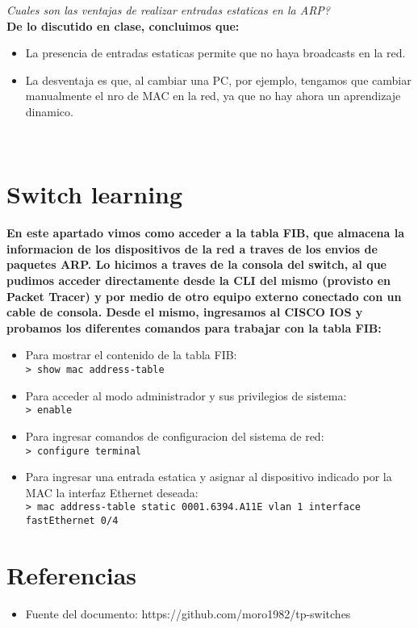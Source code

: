 \documentclass{article}
\begin{document}
\textit{Cuales son las ventajas de realizar entradas estaticas en la ARP?} \\

\textbf{De lo discutido en clase, concluimos que:} \\
\begin{itemize}
    \item La presencia de entradas estaticas permite que no haya broadcasts en la red.
    \item La desventaja es que, al cambiar una PC, por ejemplo, tengamos que cambiar manualmente el nro de MAC en la red, ya que no hay ahora un aprendizaje dinamico.
\end{itemize}
\textbf{} \\

\section{Switch learning}

\textbf{En este apartado vimos como acceder a la tabla FIB, que almacena la informacion de los dispositivos de la red a traves de los envios de paquetes ARP. Lo hicimos a traves de la consola del switch, al que pudimos acceder directamente desde la CLI del mismo (provisto en Packet Tracer) y por medio de otro equipo externo conectado con un cable de consola. Desde el mismo, ingresamos al CISCO IOS y probamos los diferentes comandos para trabajar con la tabla FIB:} \\

\begin{itemize}
    \item Para mostrar el contenido de la tabla FIB: \\
    \texttt{> show mac address-table}
    \item Para acceder al modo administrador y sus privilegios de sistema: \\
    \texttt{> enable}
    \item Para ingresar comandos de configuracion del sistema de red: \\
    \texttt{> configure terminal}
    \item Para ingresar una entrada estatica y asignar al dispositivo indicado por la MAC la interfaz Ethernet deseada: \\
    \texttt{> mac address-table static 0001.6394.A11E vlan 1 interface fastEthernet 0/4}
\end{itemize}

\newpage
\section{Referencias}
\begin{itemize}
    \item Fuente del documento: https://github.com/moro1982/tp-switches
\end{itemize}
\end{document}
